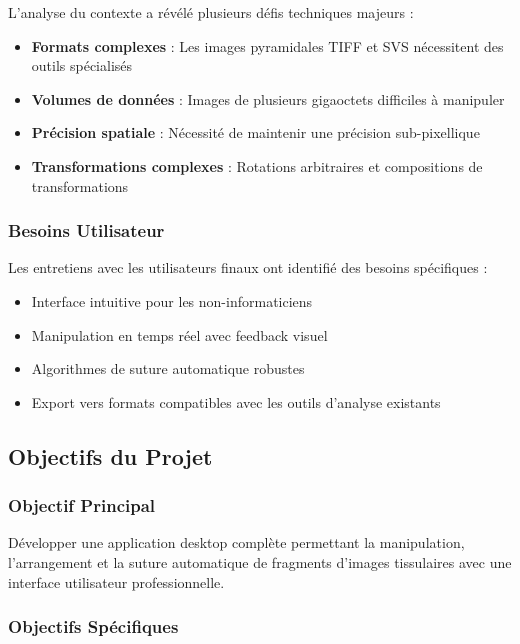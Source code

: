 \documentclass[12pt,a4paper]{article}
\begin{document}
L'analyse du contexte a révélé plusieurs défis techniques majeurs :

\begin{itemize}
\item \textbf{Formats complexes} : Les images pyramidales TIFF et SVS nécessitent des outils spécialisés
\item \textbf{Volumes de données} : Images de plusieurs gigaoctets difficiles à manipuler
\item \textbf{Précision spatiale} : Nécessité de maintenir une précision sub-pixellique
\item \textbf{Transformations complexes} : Rotations arbitraires et compositions de transformations
\end{itemize}

\subsubsection{Besoins Utilisateur}

Les entretiens avec les utilisateurs finaux ont identifié des besoins spécifiques :

\begin{itemize}
\item Interface intuitive pour les non-informaticiens
\item Manipulation en temps réel avec feedback visuel
\item Algorithmes de suture automatique robustes
\item Export vers formats compatibles avec les outils d'analyse existants
\end{itemize}

\subsection{Objectifs du Projet}

\subsubsection{Objectif Principal}

Développer une application desktop complète permettant la manipulation, l'arrangement et la suture automatique de fragments d'images tissulaires avec une interface utilisateur professionnelle.

\subsubsection{Objectifs Spécifiques}
\end{document}
